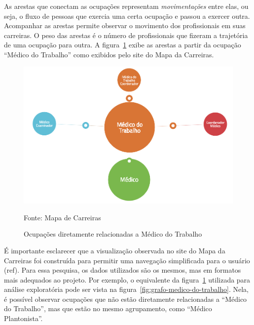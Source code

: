 \documentclass[12pt,a4paper]{article}
\theoremstyle{hypo}
\newcommand{\source}[1]{\vspace{-10pt} \caption*{Fonte: {#1}} }
\begin{document}

As arestas que conectam as ocupações representam \textit{movimentações} entre elas, ou seja, o fluxo de pessoas que exercia uma certa ocupação e passou a exercer outra. Acompanhar as arestas permite observar o movimento dos profissionais em suas carreiras. O peso das arestas é o número de profissionais que fizeram a trajetória de uma ocupação para outra. A figura~\ref{fig:exemplo-medico-do-trabalho} exibe as arestas a partir da ocupação \enquote{Médico do Trabalho} como exibidos pelo site do Mapa da Carreiras.

\begin{figure}[ht]
  \centering
  \includegraphics[scale=0.25]{mapa-medico-do-trabalho.png}
  \caption{Ocupações diretamente relacionadas a Médico do Trabalho}
  \source{Mapa de Carreiras}
  \label{fig:exemplo-medico-do-trabalho}
\end{figure}


É importante esclarecer que a visualização observada no site do Mapa da Carreiras foi construída para permitir uma navegação simplificada para o usuário (ref). Para essa pesquisa, os dados utilizados são os mesmos, mas em formatos mais adequados ao projeto. Por exemplo, o equivalente da figura~\ref{fig:exemplo-medico-do-trabalho} utilizada para análise exploratória pode ser vista na figura~\ref{fig:grafo-medico-do-trabalho}. Nela, é possível observar ocupações que não estão diretamente relacionadas a \enquote{Médico do Trabalho}, mas que estão no mesmo agrupamento, como \enquote{Médico Plantonista}.
\end{document}
